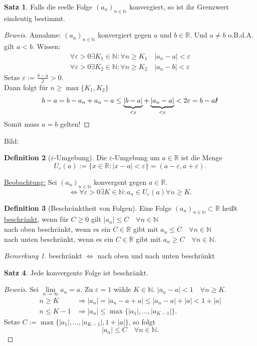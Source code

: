 \documentclass[12pt,a4paper,titlepage]{article} %
\theoremstyle{definition}
\newtheorem{satz}{Satz}[subsection]
\newtheorem{defi}[satz]{Definition}
\theoremstyle{remark}
\newtheorem*{bem}{Bemerkung}
\newenvironment{bew}{\begin{proof}[Beweis]}{\end{proof}}
\newcommand{\N}{\mathbb{N}}
\newcommand{\R}{\mathbb{R}}
\newcommand{\limes}[1]{\lim\limits_{#1\rightarrow\infty}}
\begin{document}
\begin{satz}
	Falls die reelle Folge $(a_n)_{n\in\N}$ konvergiert, so ist ihr Grenzwert eindeutig bestimmt.
\end{satz}
\begin{bew}
	Annahme: $(a_n)_{n\in\N}$ konvergiert gegen $a$ und $b\in\R$. Und $a\neq b$ o.B.d.A. gilt $a<b$.
	Wissen: 
	\begin{align*}
		\forall \varepsilon>0\exists K_1\in\N: \forall n\geq K_1 \quad |a_n -a| <\varepsilon\\
		\forall \varepsilon>0\exists K_2\in\N: \forall n\geq K_2 \quad |a_n -b| <\varepsilon
	\end{align*}
	Setze $\varepsilon:=\frac{b-a}{2} >0$.\\
	Dann folgt für $n\geq \max \{K_1,K_2\}$
	$$b-a = b-a_n + a_n -a \leq \underbrace{|b-a|}_{<\varepsilon} + \underbrace{|a_n-a|}_{<\varepsilon} < 2\varepsilon = b-a \text{\Lightning}$$
	Somit muss $a=b$ gelten!
\end{bew}
Bild: %
\begin{defi}[$\varepsilon$-Umgebung]
	Die $\varepsilon$-Umgebung um $a\in\R$ ist die Menge
	$$U_\varepsilon(a):= \{x\in\R: |x-a| <\varepsilon\} = (a-\varepsilon, a+\varepsilon).$$
\end{defi}
\underline{Beobachtung:} Sei $(a_n)_{n\in\N}$ konvergent gegen $a\in\R$.
$$\Leftrightarrow \forall\varepsilon >0 \exists K\in\N: a_n \in U_\varepsilon(a) \forall n\geq K.$$
\begin{defi}[Beschränktheit von Folgen]
	Eine Folge $(a_n)_{n\in\N} \subset \R$ heißt \underline{beschränkt}, wenn für $C\geq 0$ gilt $|a_n|\leq C \quad \forall n\in\N$\\
	nach oben beschränkt, wenn es ein $C\in\R$ gibt mit $a_n\leq C \quad \forall n\in\N$\\
	nach unten beschränkt, wenn es ein $C\in\R$ gibt mit $a_n\geq C \quad \forall n\in\N$.
\end{defi}
\begin{bem}
	beschränkt $\Leftrightarrow$ nach oben und nach unten beschränkt
\end{bem}
\begin{satz}
	Jede konvergente Folge ist beschränkt.
\end{satz}
\begin{bew}
	Sei $\limes{n} a_n = a$. Zu $\varepsilon = 1$ wähle $K\in\N$.
	$|a_n-a|<1 \quad \forall n\geq K$.
	\begin{align*}
		n\geq K &\Rightarrow |a_n| = |a_n -a+a| \leq |a_n -a| + |a| < 1 + |a|\\
		n\leq K-1 &\Rightarrow |a_n| \leq \max\{|a_1|,\ldots,|a_{K-1}|\}.
	\end{align*}
	Setze $C:= \max\{|a_1|,\ldots,|a_{K-1}|, 1 + |a|\}$, so folgt
	$$|a_n| \leq C \quad\forall n\in\N.$$
\end{bew}
\end{document}
